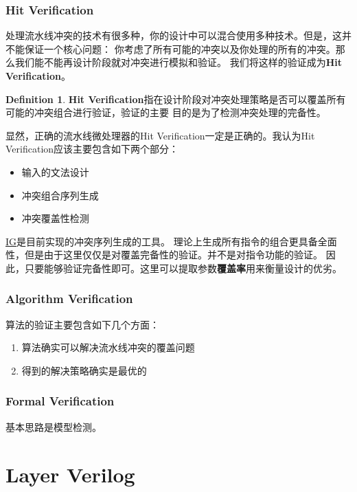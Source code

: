 \documentclass[hyperref,UTF8]{ctexart}
\theoremstyle{definition}
\newtheorem{defn}[thm]{Definition}
\theoremstyle{remark}
\numberwithin{equation}{subsection}
\newcommand{\Emph}{\textbf}
\begin{document}
\subsubsection{Hit Verification}

	处理流水线冲突的技术有很多种，你的设计中可以混合使用多种技术。但是，这并不能保证一个核心问题：
	你考虑了所有可能的冲突以及你处理的所有的冲突。那么我们能不能再设计阶段就对冲突进行模拟和验证。
	我们将这样的验证成为\Emph{Hit Verification}。
	
	\begin{defn}
	\label{defn:hit_verify}
	\Emph{Hit Verification}指在设计阶段对冲突处理策略是否可以覆盖所有可能的冲突组合进行验证，验证的主要
	目的是为了检测冲突处理的完备性。
	\end{defn}
	
	显然，正确的流水线微处理器的Hit Verification一定是正确的。我认为Hit Verification应该主要包含如下两个部分：
	\begin{itemize}
		\item 输入的文法设计
		\item 冲突组合序列生成
		\item 冲突覆盖性检测
	\end{itemize}
	\href{https://github.com/Turf1013/PPC_AutoTool/tree/master/IG}{IG}是目前实现的冲突序列生成的工具。
	理论上生成所有指令的组合更具备全面性，但是由于这里仅仅是对覆盖完备性的验证。并不是对指令功能的验证。
	因此，只要能够验证完备性即可。这里可以提取参数\Emph{覆盖率}用来衡量设计的优劣。

\subsubsection{Algorithm Verification}

	算法的验证主要包含如下几个方面：
	\begin{enumerate}[(1)]
		\item 算法确实可以解决流水线冲突的覆盖问题
		\item 得到的解决策略确实是最优的
	\end{enumerate}

\subsubsection{Formal Verification}

	基本思路是模型检测。
	
\section{Layer Verilog}
\label{sec:layer_verilog}	
\end{document}

